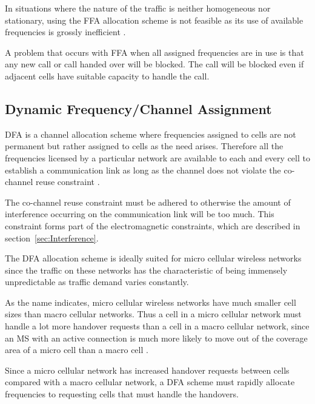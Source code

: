 In situations where the nature of the traffic is neither homogeneous nor stationary, using the \gls{FFA} allocation scheme is not feasible as its use of available frequencies is grossly inefficient \cite{PrinciplesMobileCommunication}.

A problem that occurs with \gls{FFA} when all assigned frequencies are in use is that any new call or call handed over will be blocked\cite{PrinciplesMobileCommunication}. The call will be blocked even if adjacent cells have suitable capacity to handle the call\cite{PrinciplesMobileCommunication}.

\subsection{Dynamic Frequency/Channel Assignment}
\gls{DFA} is a channel allocation scheme where frequencies assigned to cells are not permanent but rather assigned to cells as the need arises\cite{PrinciplesMobileCommunication}. Therefore all the frequencies licensed by a particular network are available to each and every cell to establish a communication link as long as the channel does not violate the co-channel reuse constraint \cite{PrinciplesMobileCommunication}. 

The co-channel reuse constraint must be adhered to otherwise the amount of interference occurring on the communication link will be too much. This constraint forms part of the electromagnetic constraints, which are described in section~\ref{sec:Interference}.

The \gls{DFA} allocation scheme is ideally suited for micro cellular wireless networks since the traffic on these networks has the characteristic of being immensely unpredictable as traffic demand varies constantly\cite{PrinciplesMobileCommunication,WirelessCommunications,MobileWirelessCommunications}.

As the name indicates, micro cellular wireless networks have much smaller cell sizes than macro cellular networks. Thus a cell in a micro cellular network must handle a lot more handover requests than a cell in a macro cellular network, since an \gls{MS} with an active connection is much more likely to move out of the coverage area of a micro cell than a macro cell \cite{PrinciplesMobileCommunication,WirelessCommunications,MobileWirelessCommunications}.

Since a micro cellular network has increased handover requests between cells compared with a macro cellular network, a \gls{DFA} scheme must rapidly allocate frequencies to requesting cells that must handle the handovers\cite{PrinciplesMobileCommunication,WirelessCommunications,MobileWirelessCommunications}.

